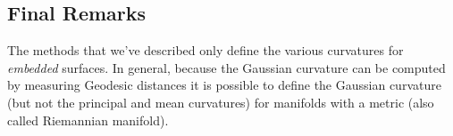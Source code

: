 \subsection{Final Remarks}
The methods that we've described only define the various curvatures for \emph{embedded} surfaces. In general, because the Gaussian curvature can be computed by measuring Geodesic distances it is possible to define the Gaussian curvature (but not the principal and mean curvatures) for manifolds with a metric (also called Riemannian manifold).
